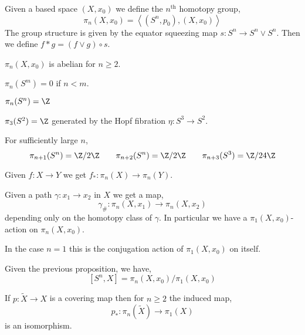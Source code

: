 \documentclass[12pt]{extarticle}
\begin{document}
\begin{definition}
Given a based space $(X, x_0)$ we define the $n^{\mathrm{th}}$ homotopy group,
\[ \pi_n(X, x_0) = \left< (S^n, p_0), (X, x_0) \right> \]
The group structure is given by the equator squeezing map $s : S^n \to S^n \vee S^n$. Then we define $f * g = (f \vee g) \circ s$. 
\end{definition}

\begin{proposition}
$\pi_n(X, x_0)$ is abelian for $n \ge 2$. 
\end{proposition}


\begin{theorem}
$\pi_n(S^m) = 0$ if $n < m$.
\end{theorem}

\begin{theorem}
$\pi_n(S^n) = \Z$
\end{theorem}

\begin{theorem}
$\pi_3(S^2) = \Z$ generated by the Hopf fibration $\eta : S^3 \to S^2$. 
\end{theorem}

\begin{theorem}
For sufficiently large $n$,
\[ \pi_{n+1}(S^n) = \Z / 2 \Z \quad \quad \pi_{n + 2}(S^n) = \Z / 2 \Z \quad \quad \pi_{n+3}(S^3) = \Z / 2 4 \Z \]
\end{theorem}

\begin{remark}
Given $f : X \to Y$ we get $f_* : \pi_n(X) \to \pi_n(Y)$. 
\end{remark}

\begin{theorem}
Given a path $\gamma : x_1 \to x_2$ in $X$ we get a map,
\[ \gamma_{\#} : \pi_n(X, x_1) \to \pi_n(X, x_2) \]
depending only on the homotopy class of $\gamma$. 
In particular we have a $\pi_1(X, x_0)$-action on $\pi_n(X, x_0)$.
\end{theorem}

\begin{remark}
In the case $n = 1$ this is the conjugation action of $\pi_1(X, x_0)$ on itself.  
\end{remark}

\begin{proposition}
Given the previous proposition, we have,
\[ [S^n, X] = \pi_n(X, x_0) / \pi_1(X, x_0) \]
\end{proposition}

\begin{proposition}
If $p : \tilde{X} \to X$ is a covering map then for $n \ge 2$ the induced map,
\[ p_* : \pi_n(\tilde{X}) \to \pi_1(X) \]
is an isomorphism.
\end{proposition}
\end{document}
